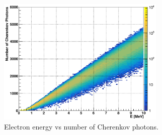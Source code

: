 \begin{figure}[htbp]
	\centering
	\includegraphics[width=8cm]{2dmap_EvsNphoton.png}
	\caption{Electron energy vs number of Cherenkov photons.}
	\label{N16energyMap}
\end{figure}







